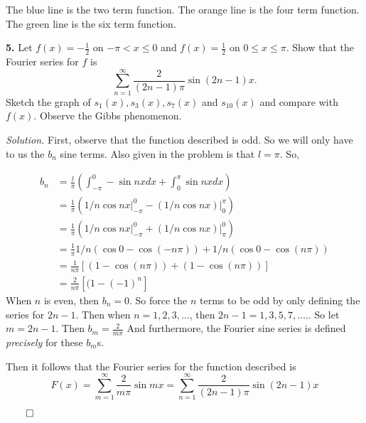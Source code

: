 \documentclass{article}
\begin{document}
The blue line is the two term function. The orange line is the four term function. The green line is the six term function. 

\newpage


\textbf{5.} Let \( f(x) = -\frac{1}{2} \) on \(- \pi < x \leq 0 \) and \( f(x) = \frac{1}{2} \) on \(0 \leq x \leq \pi \).  Show that the Fourier series for \(f\) is
\[
\sum_{n=1}^{\infty} \frac{2}{(2n-1)\pi } \sin(2n-1) x. 
\]
Sketch the graph of \(s_1(x),s_3(x), s_7(x) \) and \(s_10(x)\) and compare with \(f(x)\). Observe the Gibbs phenomenon.


\vspace{4mm} 
\textit{Solution.} First, observe that the function described is odd. So we will only have to us the \(b_n\) sine terms. Also given in the problem is that \(l=\pi\). So, 

\begin{align*}
b_n &= \frac l\pi \left( \int_{-\pi}^0 -\sin nx dx + \int_0^\pi \sin nx dx \right) \\
&=  \frac 1\pi \left(1/n  \cos nx \Big|_{-\pi}^0  - (1/n \cos nx ) \Big|_0^{\pi}  \right) \\
&=  \frac 1\pi \left(1/n  \cos nx \Big|_{-\pi}^0  + (1/n \cos nx ) \Big|_{\pi}^0 \right) \\
&=  \frac 1\pi  1/n( \cos 0 - \cos(-n\pi) ) + 1/n(\cos 0 - \cos(n\pi) )  \\
&= \frac 1{n\pi}[ (1- \cos(n\pi) ) + (1-\cos(n\pi) ) ] \\
&=\frac 2{n\pi}[ (1- (-1)^n ] 
\end{align*}
When  \(n\) is even, then \(b_n=0\). 
So force the \(n\) terms to be odd by only defining the series for \(2n-1\). Then when \(n=1,2,3,\ldots\),  then \(2n-1= 1,3,5,7,\ldots. \). So let \(m = 2n-1\). Then  \(b_m=\frac{2}{m\pi}\) And furthermore, the Fourier sine series is defined \textit{precisely} for these \(b_m\)s. 

Then it follows that the Fourier series for the function described is 
\[
F(x) = \sum_{m=1}^\infty \frac 2{m\pi} \sin mx = \sum_{n=1}^\infty \frac 2{(2n-1)\pi} \sin(2n-1)x
\]
\begin{flushright}
\( \qed\)
\end{flushright}
\end{document}
